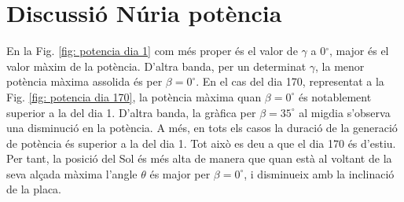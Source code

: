\documentclass[11pt]{article}
\begin{document}
\section{Discussió Núria potència}

En la Fig. \ref{fig: potencia dia 1} com més proper és el valor de $\gamma$ a 0$^{\circ}$, major és el valor màxim de la potència. D'altra banda, per un determinat $\gamma$, la menor potència màxima assolida és per $\beta=0^{\circ}$. En el cas del dia 170, representat a la Fig. \ref{fig: potencia dia 170}, la potència màxima quan $\beta=0^{\circ}$ és notablement superior a la del dia 1. D'altra banda, la gràfica per $\beta=35^{\circ}$ al migdia s'observa una disminució en la potència. A més, en tots els casos la duració de la generació de potència és superior a la del dia 1. Tot això es deu a que el dia 170 és d'estiu. Per tant, la posició del Sol és més alta de manera que quan està al voltant de la seva alçada màxima l’angle $\theta$ és major per $\beta=0^{\circ}$, i disminueix amb la inclinació de la placa.
\end{document}
